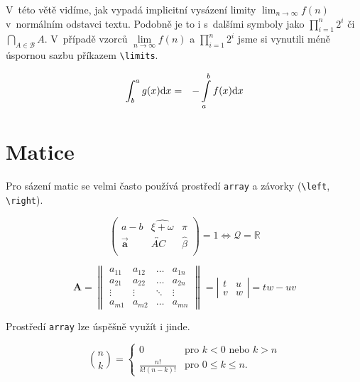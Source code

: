 \documentclass[a4paper, 11pt,twocolumn]{article}
\begin{document}
V~této větě vidíme, jak vypadá implicitní vysázení limity $\lim_{n\to\infty}f(n)$ v~normálním odstavci textu. Podobně je to i s~dalšími symboly jako $\prod_{i=1}^{n}2^i$ či $\bigcap_{A \in \mathcal{B}} A$. V~případě vzorců $\lim\limits_{n\to\infty} f(n)$ a $\prod\limits _{i=1}^n 2^i$ jsme si vynutili méně úspornou sazbu příkazem \verb|\limits|.

\begin{eqnarray}
\int_{b}^{a}g(x)\mathrm{d}x & = & - \int\displaylimits_{a}^{b}f(x)\mathrm{d}x 
\end{eqnarray}
\section{Matice}
Pro sázení matic se velmi často používá prostředí \verb|array|
a závorky (\verb|\left|, \verb|\right|).

\begin{equation*}
    \left(
\begin{array}{ccc}
a - b & \widehat{\xi + \omega} & \pi \\
\vec{\mathbf{a}} & \overleftrightarrow{AC} & \hat{\beta} \\
\end{array}
\right) 
= 1 \Longleftrightarrow \mathcal{Q} = \mathbb{R}
\end{equation*}

\begin{equation*}
\mathbf{A} = 
\left\|
\begin{array}{cccc}
a_{11} & a_{12} &\dots&a_{1n}\\
a_{21} & a_{22} &\dots&a_{2n}\\
\vdots & \vdots &\ddots&\vdots\\
a_{m1} & a_{m2} &\dots&a_{mn}
\end{array}
\right\|
 = 
\left|
\begin{array}{cc}
t & u \\
v & w
\end{array}
\right|
 = 
tw - uv    
\end{equation*}

Prostředí \verb|array| lze úspěšně využít i jinde.

$$
\binom{n}{k}
= 
\left\{
\begin{array}{cl}
0 & \text{pro } k < 0 \text{ nebo } k > n \\
\frac{n!}{k!(n - k)!} & \text{pro } 0 \leq k \leq n.
\end{array} \right.
$$
\end{document}
